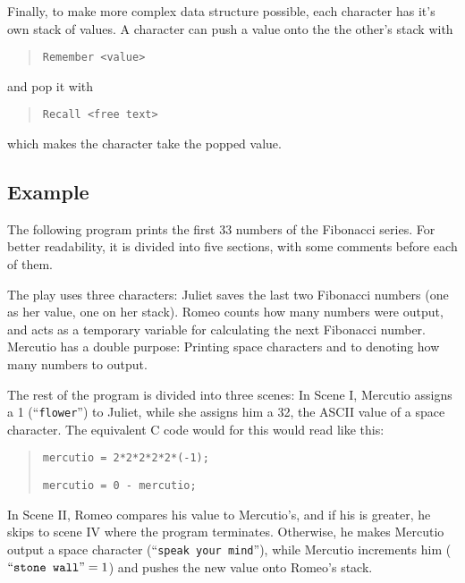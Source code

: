 Finally, to make more complex data structure possible, each character has it's own stack of values. A character can push a value onto the the other's stack with

\begin{quotation}
    \texttt{Remember <value>}
\end{quotation}

and pop it with

\begin{quotation}
    \texttt{Recall <free text>}
\end{quotation}

which makes the character take the popped value.

\subsection{Example}

The following program prints the first 33 numbers of the Fibonacci series. For better readability, it is divided into five sections, with some comments before each of them.

The play uses three characters: Juliet saves the last two Fibonacci numbers (one as her value, one on her stack). Romeo counts how many numbers were output, and acts as a temporary variable for calculating the next Fibonacci number. Mercutio has a double purpose: Printing space characters and to denoting how many numbers to output.



The rest of the program is divided into three scenes: In Scene I, Mercutio assigns a 1 (“\texttt{flower}”) to Juliet, while she assigns him a 32, the ASCII value of a space character. The equivalent C code would for this would read like this:

\begin{quotation}
    \texttt{mercutio = 2*2*2*2*2*(-1);}

    \texttt{mercutio = 0 - mercutio;}
\end{quotation}



In Scene II, Romeo compares his value to Mercutio's, and if his is greater, he skips to scene IV where the program terminates. Otherwise, he makes Mercutio output a space character (“\texttt{speak your mind}”), while Mercutio increments him ($\text{“\texttt{stone wall}”} = 1$) and pushes the new value onto Romeo's stack.

